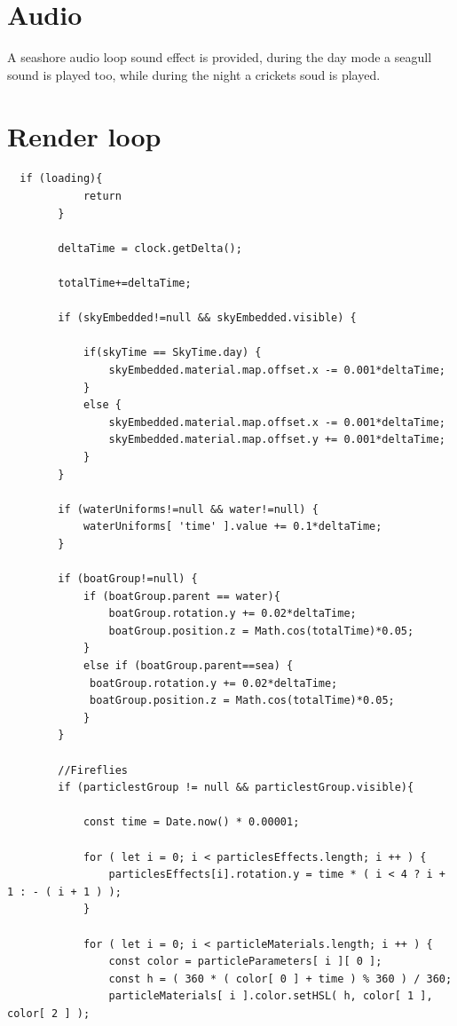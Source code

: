 \documentclass[10pt,a4paper]{article}
\begin{document}
\section{Audio}

A seashore audio loop sound effect is provided, during the day mode a seagull sound is played too, while during the night a crickets soud is played.

\section{Render loop}

\begin{verbatim}
  if (loading){
            return
        }

        deltaTime = clock.getDelta();
     
        totalTime+=deltaTime;

        if (skyEmbedded!=null && skyEmbedded.visible) {

            if(skyTime == SkyTime.day) {
                skyEmbedded.material.map.offset.x -= 0.001*deltaTime; 
            }
            else {
                skyEmbedded.material.map.offset.x -= 0.001*deltaTime; 
                skyEmbedded.material.map.offset.y += 0.001*deltaTime; 
            }
        }
        
        if (waterUniforms!=null && water!=null) {
            waterUniforms[ 'time' ].value += 0.1*deltaTime;
        }

        if (boatGroup!=null) {
            if (boatGroup.parent == water){
                boatGroup.rotation.y += 0.02*deltaTime;
                boatGroup.position.z = Math.cos(totalTime)*0.05;
            }
            else if (boatGroup.parent==sea) {
             boatGroup.rotation.y += 0.02*deltaTime;
             boatGroup.position.z = Math.cos(totalTime)*0.05;
            } 
        }

        //Fireflies
        if (particlestGroup != null && particlestGroup.visible){

            const time = Date.now() * 0.00001;
            
            for ( let i = 0; i < particlesEffects.length; i ++ ) {
                particlesEffects[i].rotation.y = time * ( i < 4 ? i + 1 : - ( i + 1 ) );
            }

            for ( let i = 0; i < particleMaterials.length; i ++ ) {
                const color = particleParameters[ i ][ 0 ];
                const h = ( 360 * ( color[ 0 ] + time ) % 360 ) / 360;
                particleMaterials[ i ].color.setHSL( h, color[ 1 ], color[ 2 ] );


\end{verbatim}
\end{document}

